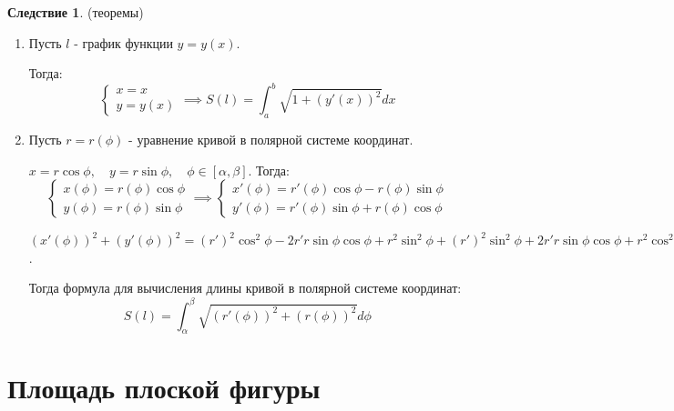 \documentclass{report}
\theoremstyle{definition}
\newtheorem*{effect}{Следствие}
\begin{document}
\begin{effect}
  (теоремы)

  \begin{enumerate}
    \item Пусть $l$ - график функции $y=y(x)$.

          Тогда:
          \begin{equation*}
            \left\{
            \begin{array}{ll}
              x = x \\
              y=y(x)
            \end{array}
            \right. \implies S(l) = \int_{a}^{b}\sqrt{1 + (y'(x))^2}dx
          \end{equation*}

    \item Пусть $r = r(\phi)$ - уравнение кривой в полярной системе координат.

          $x = r\cos\phi, \quad y = r\sin\phi, \quad \phi\in[\alpha,\beta]$.
          Тогда:
          \begin{equation*}
            \left\{
            \begin{array}{ll}
              x(\phi) = r(\phi)\cos\phi \\
              y(\phi) = r(\phi)\sin\phi
            \end{array}
            \right. \implies
            \left\{
            \begin{array}{ll}
              x'(\phi) = r'(\phi)\cos\phi - r(\phi)\sin\phi \\
              y'(\phi) = r'(\phi)\sin\phi + r(\phi)\cos\phi
            \end{array}
            \right.
          \end{equation*}

          $(x'(\phi))^2 + (y'(\phi))^2 = (r')^2\cos^2\phi - 2r'r\sin\phi\cos\phi + r^2\sin^2\phi + (r')^2
            \sin^2\phi + 2r'r\sin\phi\cos\phi + r^2\cos^2\phi = (r')^2 + r^2$.

          Тогда формула для вычисления длины кривой в полярной системе координат:
          \begin{equation*}
            S(l) = \int_{\alpha}^{\beta}\sqrt{(r'(\phi))^2 + (r(\phi))^2}d\phi
          \end{equation*}
  \end{enumerate}
\end{effect}

\section{Площадь плоской фигуры}
\end{document}
